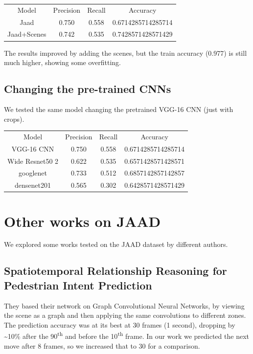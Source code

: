 \documentclass[11pt]{article}
\begin{document}
    \begin{center}
    \begin{tabular}{| c c c c |}\hline
     Model & Precision & Recall & Accuracy\\
     Jaad & 0.750 & 0.558 & 0.6714285714285714 \\
     Jaad+Scenes & 0.742 & 0.535 & 0.7428571428571429\\\hline
    \end{tabular}
    \end{center}

    The results improved by adding the scenes, but the train accuracy (0.977) is still much higher, showing some overfitting.


    \subsection*{Changing the pre-trained CNNs}
    We tested the same model changing the pretrained VGG-16 CNN (just with crops).


    \begin{center}
    \begin{tabular}{| c c c c |}\hline
        Model           & Precision & Recall & Accuracy\\
        VGG-16 CNN      & 0.750     & 0.558  & 0.6714285714285714 \\
        Wide Resnet50 2 & 0.622     & 0.535  & 0.6571428571428571 \\
        googlenet       & 0.733     & 0.512  & 0.6857142857142857 \\
        densenet201     & 0.565     & 0.302  & 0.6428571428571429 \\\hline



    \end{tabular}
    \end{center}

\section{Other works on JAAD}
We explored some works tested on the JAAD dataset by different authors.
\subsection*{Spatiotemporal Relationship Reasoning for Pedestrian Intent Prediction}
They\cite{liu2020spatiotemporal} based their network on
Graph Convolutional Neural Networks\cite{GCNN}, by viewing the scene as a graph and then applying the same convolutions
to different zones.
The prediction accuracy was at its best at 30 frames (1 second), dropping by \textasciitilde 10\% after the 90\textsuperscript{th} and
before the 10\textsuperscript{th} frame.
In our work we predicted the next move after 8 frames, so we increased that to 30 for a comparison.
\end{document}
